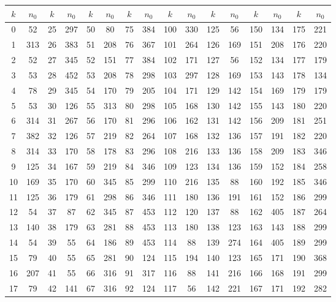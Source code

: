 \begin{tabular}{|c|c|c|c|c|c|c|c|c|c|c|c|c|c|c|c|}
    \hline
    $k$ & $n_0$ & $k$ & $n_0$ & $k$ & $n_0$ & $k$ & $n_0$ & $k$ & $n_0$ & $k$ & $n_0$ & $k$ & $n_0$ & $k$ & $n_0$\\
    \hline
    0 & 52 & 25 & 297 & 50 & 80 & 75 & 384 & 100 & 330 & 125 & 56 & 150 & 134 & 175 & 221\\
    1 & 313 & 26 & 383 & 51 & 208 & 76 & 367 & 101 & 264 & 126 & 169 & 151 & 208 & 176 & 220\\
    2 & 52 & 27 & 345 & 52 & 151 & 77 & 384 & 102 & 171 & 127 & 56 & 152 & 134 & 177 & 179\\
    3 & 53 & 28 & 452 & 53 & 208 & 78 & 298 & 103 & 297 & 128 & 169 & 153 & 143 & 178 & 134\\
    4 & 78 & 29 & 345 & 54 & 170 & 79 & 205 & 104 & 171 & 129 & 142 & 154 & 169 & 179 & 179\\
    5 & 53 & 30 & 126 & 55 & 313 & 80 & 298 & 105 & 168 & 130 & 142 & 155 & 143 & 180 & 220\\
    6 & 314 & 31 & 267 & 56 & 170 & 81 & 296 & 106 & 162 & 131 & 142 & 156 & 209 & 181 & 251\\
    7 & 382 & 32 & 126 & 57 & 219 & 82 & 264 & 107 & 168 & 132 & 136 & 157 & 191 & 182 & 220\\
    8 & 314 & 33 & 170 & 58 & 178 & 83 & 296 & 108 & 216 & 133 & 136 & 158 & 209 & 183 & 346\\
    9 & 125 & 34 & 167 & 59 & 219 & 84 & 346 & 109 & 123 & 134 & 136 & 159 & 152 & 184 & 258\\
    10 & 169 & 35 & 170 & 60 & 345 & 85 & 299 & 110 & 216 & 135 & 88 & 160 & 192 & 185 & 346\\
    11 & 125 & 36 & 179 & 61 & 298 & 86 & 346 & 111 & 180 & 136 & 191 & 161 & 152 & 186 & 299\\
    12 & 54 & 37 & 87 & 62 & 345 & 87 & 453 & 112 & 120 & 137 & 88 & 162 & 405 & 187 & 264\\
    13 & 140 & 38 & 179 & 63 & 281 & 88 & 453 & 113 & 180 & 138 & 123 & 163 & 143 & 188 & 299\\
    14 & 54 & 39 & 55 & 64 & 186 & 89 & 453 & 114 & 88 & 139 & 274 & 164 & 405 & 189 & 299\\
    15 & 79 & 40 & 55 & 65 & 281 & 90 & 124 & 115 & 194 & 140 & 123 & 165 & 171 & 190 & 368\\
    16 & 207 & 41 & 55 & 66 & 316 & 91 & 317 & 116 & 88 & 141 & 216 & 166 & 168 & 191 & 299\\
    17 & 79 & 42 & 141 & 67 & 316 & 92 & 124 & 117 & 56 & 142 & 221 & 167 & 171 & 192 & 282\\

\end{tabular}

